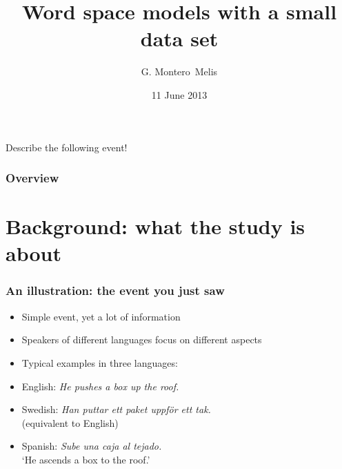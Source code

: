\documentclass[]{beamer}
\title{
Word space models with a small data set
}
\author{G. Montero~Melis}
\institute{Centre for Research on Bilingualism \\Stockholm University}
\date{11 June 2013}
\begin{document}


\begin{frame}[fragile]
	\maketitle
\end{frame}


\begin{frame}
	Describe the following event!
\end{frame}

\begin{frame}
\end{frame}

\begin{frame}
	\frametitle{Overview}
	\tableofcontents
\end{frame}


\section{Background: what the study is about}


\begin{frame}
	\frametitle{An illustration: the event you just saw}
	\begin{itemize}
	\item Simple event, yet a lot of information
	\item Speakers of different languages focus on different aspects
	\item Typical examples in three languages: \pause
	\item English: \emph{He \alert{pushes} a box \alert{up} the roof.} \pause
	\item Swedish: \emph{Han \alert{puttar} ett paket \alert{uppf\"{o}r} ett tak.} 
		\\(equivalent to English)\pause
	\item Spanish: \emph{\alert{Sube} una caja al tejado.}
		\\`He ascends a box to the roof.'
	\end{itemize}
\end{frame}
\end{document}
